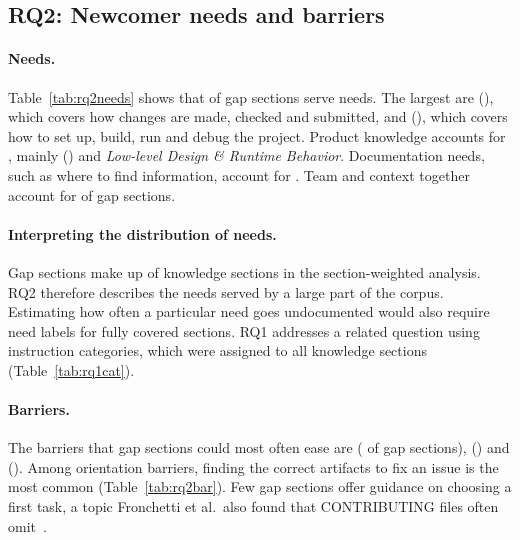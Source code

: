 \documentclass[sigconf,nonacm]{acmart}
\begin{document}
\subsection{RQ2: Newcomer needs and barriers}

\paragraph{Needs.} Table~\ref{tab:rq2needs} shows that \needGroupTopShare{} of gap sections serve
\emph{\needGroupTop} needs. The largest are \emph{\needTopOne} (\needTopOneShare), which covers how
changes are made, checked and submitted, and \emph{\needTopTwo} (\needTopTwoShare), which covers how
to set up, build, run and debug the project. Product knowledge accounts for \needGroupProduct,
mainly \emph{\needTopThree} (\needTopThreeShare) and \emph{Low-level Design \& Runtime Behavior}.
Documentation needs, such as where to find information, account for \needGroupDocs. Team and
context together account for \needGroupTeamContext{} of gap sections.





\paragraph{Interpreting the distribution of needs.} Gap sections make up \sectionGapShare{} of
knowledge sections in the section-weighted analysis. RQ2 therefore describes the needs served by
a large part of the corpus. Estimating how often a particular need goes undocumented would also
require need labels for fully covered sections. RQ1 addresses a related question using instruction
categories, which were assigned to all knowledge sections (Table~\ref{tab:rq1cat}).

\paragraph{Barriers.} The barriers that gap sections could most often ease are
\emph{\barrierTopOne} (\barrierTopOneShare{} of gap sections), \emph{\barrierTopTwo}
(\barrierTopTwoShare) and \emph{\barrierTopThree} (\barrierTopThreeShare). Among orientation
barriers, finding the correct artifacts to fix an issue is the most common
(Table~\ref{tab:rq2bar}). Few gap sections offer guidance on choosing a first task, a topic
Fronchetti et al.\ also found that CONTRIBUTING files often omit~\cite{fronchetti2023contributing}.
\end{document}
